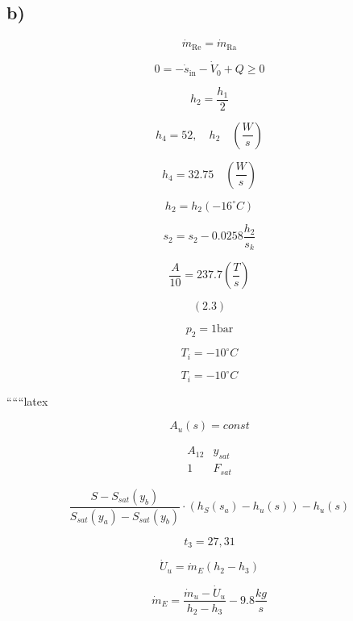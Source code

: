 

\subsection*{b)}

\[
\dot{m}_{\text{Re}} = \dot{m}_{\text{Ra}}
\]

\[
0 = -\dot{s}_{\text{in}} - \dot{V}_0 + Q \geq 0
\]

\[
h_2 = \frac{h_1}{2}
\]

\[
h_4 = 52, \quad h_2 \quad \left( \frac{W}{s} \right)
\]

\[
h_4 = 32.75 \quad \left( \frac{W}{s} \right)
\]

\[
h_2 = h_2(-16^\circ C)
\]

\[
s_2 = s_2 - 0.0258 \frac{h_2}{s_k}
\]

\[
\frac{A}{10} = 237.7 \left( \frac{T}{s} \right)
\]

\[
(2.3)
\]

\[
p_2 = 1 \text{bar}
\]

\[
T_i = -10^\circ C
\]

\[
T_i = -10^\circ C
\]

``````latex


\[
A_{u}(s) = const
\]

\[
\begin{array}{ccc}
A_{12} & y_{sat} \\
1 & F_{sat}
\end{array}
\]

\[
\frac{S - S_{sat}(y_{b})}{S_{sat}(y_{a}) - S_{sat}(y_{b})} \cdot \left( h_{S}(s_{a}) - h_{u}(s) \right) - h_{u}(s)
\]

\[
t_{3} = 27,31
\]

\[
\dot{U}_{u} = \dot{m}_{E} (h_{2} - h_{3})
\]

\[
\dot{m}_{E} = \frac{\dot{m}_{u} - \dot{U}_{u}}{h_{2} - h_{3}} - 9.8 \frac{kg}{s}
\]